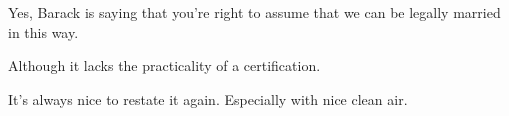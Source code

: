 

Yes, Barack is saying that you're right to assume that we can be
legally married in this way.  

Although it lacks the practicality of a certification.

It's always nice to restate it again.  Especially with nice clean air.

\bye
